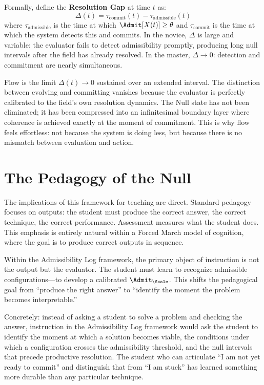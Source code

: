 \documentclass[11pt,oneside]{book}
\begin{document}
Formally, define the \textbf{Resolution Gap} at time $t$ as:
\begin{equation}
    \Delta(t) = \tau_{\mathrm{commit}}(t) - \tau_{\mathrm{admissible}}(t)
\end{equation}
where $\tau_{\mathrm{admissible}}$ is the time at which $\Admit[X(t)] \ge \theta$ and $\tau_{\mathrm{commit}}$ is the time at which the system detects this and commits. In the novice, $\Delta$ is large and variable: the evaluator fails to detect admissibility promptly, producing long null intervals after the field has already resolved. In the master, $\Delta \to 0$: detection and commitment are nearly simultaneous.

Flow is the limit $\Delta(t) \to 0$ sustained over an extended interval. The distinction between evolving and committing vanishes because the evaluator is perfectly calibrated to the field's own resolution dynamics. The Null state has not been eliminated; it has been compressed into an infinitesimal boundary layer where coherence is achieved exactly at the moment of commitment. This is why flow feels effortless: not because the system is doing less, but because there is no mismatch between evaluation and action.

\section{The Pedagogy of the Null}

The implications of this framework for teaching are direct. Standard pedagogy focuses on outputs: the student must produce the correct answer, the correct technique, the correct performance. Assessment measures what the student does. This emphasis is entirely natural within a Forced March model of cognition, where the goal is to produce correct outputs in sequence.

Within the Admissibility Log framework, the primary object of instruction is not the output but the evaluator. The student must learn to recognize admissible configurations---to develop a calibrated $\Admit_\Scale$. This shifts the pedagogical goal from ``produce the right answer'' to ``identify the moment the problem becomes interpretable.''

Concretely: instead of asking a student to solve a problem and checking the answer, instruction in the Admissibility Log framework would ask the student to identify the moment at which a solution becomes viable, the conditions under which a configuration crosses the admissibility threshold, and the null intervals that precede productive resolution. The student who can articulate ``I am not yet ready to commit'' and distinguish that from ``I am stuck'' has learned something more durable than any particular technique.
\end{document}
